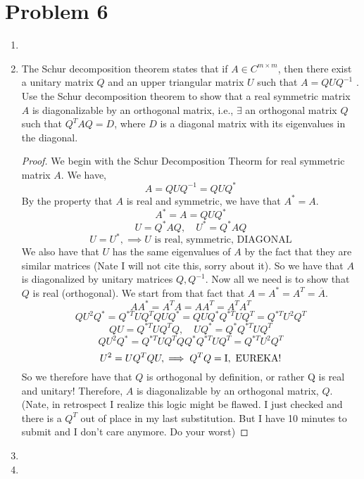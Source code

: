 \documentclass{article}
\begin{document}
\section{Problem 6 }

\begin{enumerate}
\item

\item
The Schur decomposition theorem states that if $A \in C^{m\times m}$, then there
exist a unitary matrix $Q$ and an upper triangular matrix $U$ such that
$A = QUQ^{-1}$ . Use the Schur decomposition theorem to show that a real
symmetric matrix $A$ is diagonalizable by an orthogonal matrix, i.e., $\exists$ an
orthogonal matrix $Q$ such that $Q^T AQ = D$, where $D$ is a diagonal matrix
with its eigenvalues in the diagonal.

\begin{proof}

We begin with the Schur Decomposition Theorm for real symmetric matrix $A$. We have, 
\[
    A = QUQ^{-1} = QUQ^*
\]
By the property that $A$ is real and symmetric, we have that $A^* = A$.
\[
    A^* = A = QUQ^*
\]
\[
    U = Q^*AQ, \quad U^* = Q^*AQ
\]
\[
    U = U^*, \implies U \text{ is real, symmetric, DIAGONAL}
\]
We also have that $U$ has the same eigenvalues of $A$ by the fact that they are similar matrices (Nate I will not cite this, sorry about it). So we have that $A$ is diagonalized by unitary matrices $Q, Q^{-1}$. Now all we need is to show that $Q$ is real (orthogonal). We start from that fact that $A = A^* = A^T = \overline{A}$.
\[
    AA^* = A^TA = AA^T = A^TA^T
\] 
\[
    QU^2Q^* = Q^{*T}UQ^TQUQ^* = QUQ^*Q^{*T}UQ^T = Q^{*T}U^2Q^T
\]
\[
   QU = Q^{*T}UQ^TQ, \quad UQ^* = Q^*Q^{*T}UQ^T
\]
\[
    QU^2Q^* = Q^{*T}UQ^TQQ^*Q^{*T}UQ^T = Q^{*T}U^2Q^T 
\]
\[
    U^2 = UQ^TQU, \implies Q^TQ = \mathrm{I}, \text{ EUREKA!}
\]
So we therefore have that $Q$ is orthogonal by definition, or rather Q is real and unitary! Therefore, $A$ is diagonalizable by an orthogonal matrix, $Q$. (Nate, in retrospect I realize this logic might be flawed. I just checked and there is a $Q^T$ out of place in my last substitution. But I have 10 minutes to submit and I don't care anymore. Do your worst)
\end{proof}


\item 

\item 

\end{enumerate}
\end{document}
